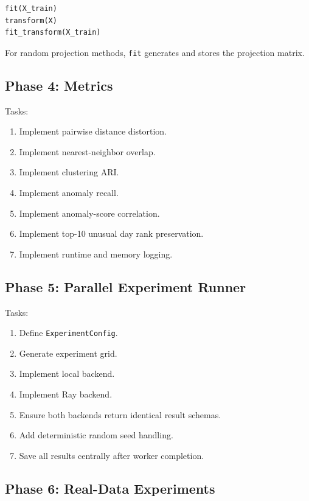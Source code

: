 \documentclass[11pt]{article}
\begin{document}
\begin{verbatim}
fit(X_train)
transform(X)
fit_transform(X_train)
\end{verbatim}

For random projection methods, \texttt{fit} generates and stores the projection matrix.

\subsection{Phase 4: Metrics}

Tasks:

\begin{enumerate}
    \item Implement pairwise distance distortion.
    \item Implement nearest-neighbor overlap.
    \item Implement clustering ARI.
    \item Implement anomaly recall.
    \item Implement anomaly-score correlation.
    \item Implement top-10 unusual day rank preservation.
    \item Implement runtime and memory logging.
\end{enumerate}

\subsection{Phase 5: Parallel Experiment Runner}

Tasks:

\begin{enumerate}
    \item Define \texttt{ExperimentConfig}.
    \item Generate experiment grid.
    \item Implement local backend.
    \item Implement Ray backend.
    \item Ensure both backends return identical result schemas.
    \item Add deterministic random seed handling.
    \item Save all results centrally after worker completion.
\end{enumerate}

\subsection{Phase 6: Real-Data Experiments}
\end{document}
